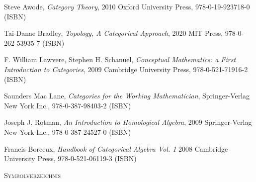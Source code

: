 \documentclass[a4paper]{amsart}
\theoremstyle{definition}
\begin{document}
\begin{thebibliography}{9}
      Steve Awode, \emph{Category Theory},
      2010 Oxford University Press, 978-0-19-923718-0 (ISBN)

      Tai-Danae Bradley, \emph{Topology, A Categorical Approach},
      2020 MIT Press, 978-0-262-53935-7 (ISBN)

      F. William Lawvere, Stephen H. Schanuel, \emph{Conceptual Mathematics: a First Introduction to Categories},
      2009 Cambridge University Press, 978-0-521-71916-2 (ISBN)

      Saunders Mac Lane, \emph{Categories for the Working Mathematician},
      Springer-Verlag New York Inc., 978-0-387-98403-2 (ISBN)

   	Joseph J. Rotman, \emph{An Introduction to Homological Algebra},
   	2009 Springer-Verlag New York Inc., 978-0-387-24527-0 (ISBN)
      
      Francis Borceux, \emph{Handbook of Categorical Algebra Vol. 1}
      2008 Cambridge University Press, 978-0-521-06119-3 (ISBN)

\end{thebibliography}

\begin{large}
    \centerline{\textsc{Symbolverzeichnis}}
\end{large}
\bigskip

\renewcommand*{\arraystretch}{1}
\end{document}
